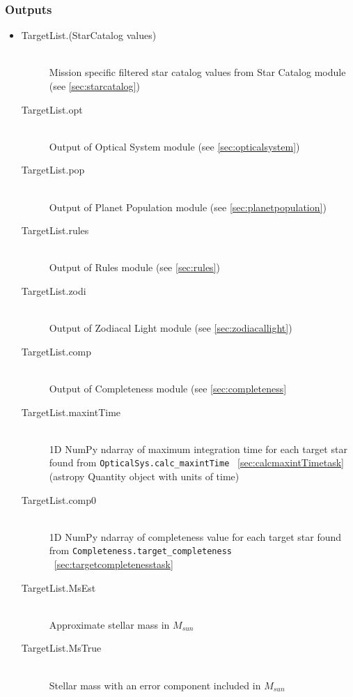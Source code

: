 \documentclass[cleanfoot]{asme2ej}
\begin{document}
\subsubsection*{Outputs}
\begin{itemize}
    \item 
    \begin{description}
        \item[TargetList.(StarCatalog values)] \hfill \\
        Mission specific filtered star catalog values from Star Catalog module (see \ref{sec:starcatalog})
        \item[TargetList.opt] \hfill \\
        Output of Optical System module (see \ref{sec:opticalsystem})
        \item[TargetList.pop] \hfill \\
        Output of Planet Population module (see \ref{sec:planetpopulation})
        \item[TargetList.rules] \hfill \\
        Output of Rules module (see \ref{sec:rules})
        \item[TargetList.zodi] \hfill \\
        Output of Zodiacal Light module (see \ref{sec:zodiacallight})
        \item[TargetList.comp] \hfill \\
        Output of Completeness module (see \ref{sec:completeness}
        \item[TargetList.maxintTime] \hfill \\
        1D NumPy ndarray of maximum integration time for each target star found from \verb+OpticalSys.calc_maxintTime+ ~\ref{sec:calcmaxintTimetask} (astropy Quantity object with units of time)
        \item[TargetList.comp0] \hfill \\
        1D NumPy ndarray of completeness value for each target star found from \verb+Completeness.target_completeness+ ~\ref{sec:targetcompletenesstask}
        \item[TargetList.MsEst] \hfill \\
        Approximate stellar mass in $ M_{sun} $
        \item[TargetList.MsTrue] \hfill \\
        Stellar mass with an error component included in $ M_{sun} $
    \end{description}
\end{itemize}
\end{document}
